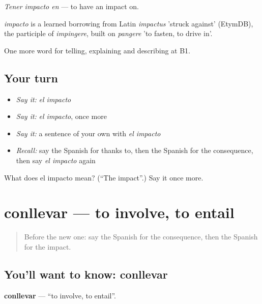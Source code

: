 \emph{Tener impacto en} — to have an impact on.

\begin{cousinweb}
\emph{impacto} is a learned borrowing from Latin \emph{impactus} 'struck against' (EtymDB), the participle of \emph{impingere}, built on \emph{pangere} 'to fasten, to drive in'.
\end{cousinweb}

\begin{grammarlens}[title={What you've built}]
One more word for telling, explaining and describing at B1.
\end{grammarlens}

\subsection*{Your turn}
\begin{itemize}
\raggedright
  \item \emph{Say it:} \emph{el impacto}
  \item \emph{Say it:} \emph{el impacto}, once more
  \item \emph{Say it:} a sentence of your own with \emph{el impacto}
  \item \emph{Recall:} say the Spanish for thanks to, then the Spanish for the consequence, then say \emph{el impacto} again
\end{itemize}

\begin{tcolorbox}[breakable,colback=teal!4,colframe=teal!35!black,title={Before you move on}]
What does el impacto mean? (\textquotedblleft{}The impact\textquotedblright{}.) Say it once more.
\end{tcolorbox}
\section[conllevar]{conllevar — to involve, to entail}

\label{lesson:ES-C582-conllevar}



\begin{quote}
Before the new one: say the Spanish for the consequence, then the Spanish for the impact.
\end{quote}

\subsection*{You'll want to know: conllevar}
\textbf{conllevar} — \textquotedblleft{}to involve, to entail\textquotedblright{}.

